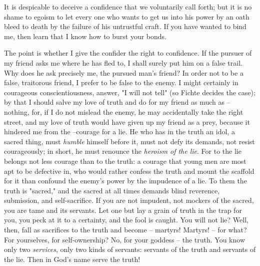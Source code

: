 \documentclass[a4paper]{book}
\begin{document}
It is despicable to deceive a confidence that we voluntarily call forth; but 
it is no shame to egoism to let every one who wants to get us into his power 
by an oath bleed to death by the failure of his untrustful craft. If you have 
wanted to bind me, then learn that I know how to burst your bonds.

The point is whether I give the confider the right to confidence. If the 
pursuer of my friend asks me where he has fled to, I shall surely put him on a 
false trail. Why does he ask precisely me, the pursued man's friend? In order 
not to be a false, traitorous friend, I prefer to be false to the enemy. I 
might certainly in courageous conscientiousness, answer, "{}I will not tell"{} 
(so Fichte decides the case); by that I should salve my love of truth and do 
for my friend as much as -- nothing, for, if I do not mislead the enemy, he 
may accidentally take the right street, and my love of truth would have given 
up my friend as a prey, because it hindered me from the --courage for a lie. 
He who has in the truth an idol, a sacred thing, must \textit{humble} himself 
before it, must not defy its demands, not resist courageously; in short, he 
must renounce the \textit{heroism of the lie}. For to the lie belongs not less 
courage than to the truth: a courage that young men are most apt to be 
defective in, who would rather confess the truth and mount the scaffold for it 
than confound the enemy's power by the impudence of a lie. To them the truth 
is "{}sacred,"{} and the sacred at all times demands blind reverence, 
submission, and self-sacrifice. If you are not impudent, not mockers of the 
sacred, you are tame and its servants. Let one but lay a grain of truth in the 
trap for you, you peck at it to a certainty, and the fool is caught. You will 
not lie? Well, then, fall as sacrifices to the truth and become -- martyrs! 
Martyrs! -- for what? For yourselves, for self-ownership? No, for your goddess 
-- the truth. You know only two \textit{services}, only two kinds of servants: 
servants of the truth and servants of the lie. Then in God's name serve the 
truth!
\end{document}
